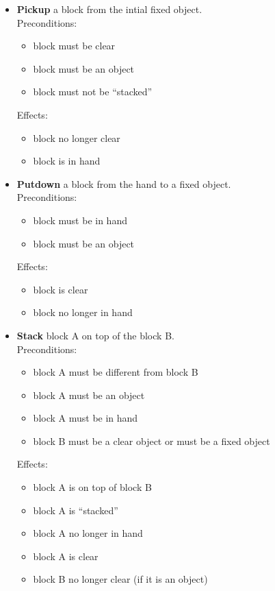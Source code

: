 \begin{itemize}

	\item \textbf{Pickup} a block from the intial fixed object. \\
Preconditions:
	\begin{itemize}
		\item block must be clear
		\item block must be an object
		\item block must not be \enquote{stacked}
	\end{itemize}
Effects:
	\begin{itemize}
		\item block no longer clear
		\item block is in hand
	\end{itemize}

	\item \textbf{Putdown} a block from the hand to a fixed object. \\
Preconditions:
	\begin{itemize}
		\item block must be in hand
		\item block must be an object
	\end{itemize}
Effects:
	\begin{itemize}
		\item block is clear
		\item block no longer in hand
	\end{itemize}

	\item \textbf{Stack} block A on top of the block B. \\
Preconditions:
	\begin{itemize}
		\item block A must be different from block B
		\item block A must be an object
		\item block A must be in hand
		\item block B must be a clear object or must be a fixed object
	\end{itemize}
Effects:
	\begin{itemize}
		\item block A is on top of block B
		\item block A is \enquote{stacked}
		\item block A no longer in hand
		\item block A is clear
		\item block B no longer clear (if it is an object)
	\end{itemize}


\end{itemize}
